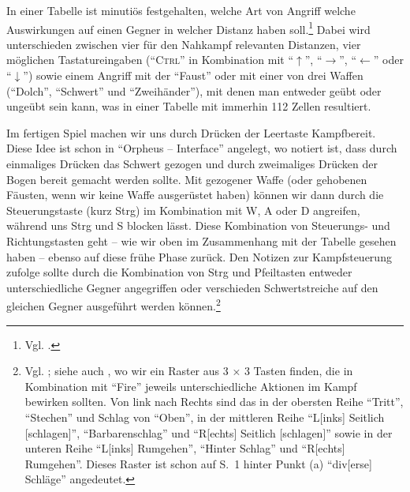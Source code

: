 \documentclass[12pt]{scrbook}
\begin{document}
In einer Tabelle ist minutiös festgehalten, welche Art von Angriff welche Auswirkungen auf einen Gegner in welcher Distanz haben soll.\footnote{Vgl. \autocite[S.~4--5]{orpheus_kampfsteuerung}.}
Dabei wird unterschieden zwischen vier für den Nahkampf relevanten Distanzen, vier möglichen Tastatureingaben (\enquote{\textsc{Ctrl}} in Kombination mit \enquote{$\uparrow$}, \enquote{$\rightarrow$}, \enquote{$\leftarrow$} oder \enquote{$\downarrow$}) sowie einem Angriff mit der \enquote{Faust} oder mit einer von drei Waffen (\enquote{Dolch}, \enquote{Schwert} und \enquote{Zweihänder}), mit denen man entweder geübt oder ungeübt sein kann, was in einer Tabelle mit immerhin 112 Zellen resultiert.\autocite[S.~4]{orpheus_kampfsteuerung}

Im fertigen Spiel machen wir uns durch Drücken der Leertaste Kampfbereit.
Diese Idee ist schon in \enquote{Orpheus -- Interface} angelegt, wo notiert ist, dass durch einmaliges Drücken das Schwert gezogen und durch zweimaliges Drücken der Bogen bereit gemacht werden sollte.\autocite[S.~2]{orpheus_interface}
Mit gezogener Waffe (oder gehobenen Fäusten, wenn wir keine Waffe ausgerüstet haben) können wir dann durch die Steuerungstaste (kurz Strg) im Kombination mit W, A oder D angreifen, während uns Strg und S blocken lässt.
Diese Kombination von Steuerungs- und Richtungstasten geht -- wie wir oben im Zusammenhang mit der Tabelle gesehen haben -- ebenso auf diese frühe Phase zurück.
Den Notizen zur Kampfsteuerung zufolge sollte durch die Kombination von Strg und Pfeiltasten entweder unterschiedliche Gegner angegriffen oder verschieden Schwertstreiche auf den gleichen Gegner ausgeführt werden können.\footnote{Vgl. \autocite[S.~1--3]{orpheus_kampfsteuerung}; siehe auch \autocite[S.~4]{orpheus_interface}, wo wir ein Raster aus 3 × 3 Tasten finden, die in Kombination mit \enquote{Fire} jeweils unterschiedliche Aktionen im Kampf bewirken sollten. Von link nach Rechts sind das in der obersten Reihe \enquote{Tritt}, \enquote{Stechen} und Schlag von \enquote{Oben}, in der mittleren Reihe \enquote{L[inks] Seitlich [schlagen]}, \enquote{Barbarenschlag} und \enquote{R[echts] Seitlich [schlagen]} sowie in der unteren Reihe \enquote{L[inks] Rumgehen}, \enquote{Hinter Schlag} und \enquote{R[echts] Rumgehen}. Dieses Raster ist schon auf S.~1 hinter Punkt (a) \enquote{div[erse] Schläge} angedeutet.}
\end{document}
